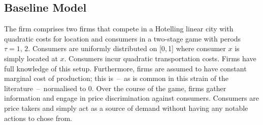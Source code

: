 \documentclass[a4paper, 11 pt, fleqn]{article}
\begin{document}
\subsection{Baseline Model} \label{sec:choe-baseline} %
The firm comprises two firms that compete in a Hotelling linear city with quadratic costs for location and consumers in a two-stage game
with perods $\tau = 1,\,2$. Consumers are uniformly distributed on [0,\,1] where consumer $x$ is simply located at $x$.
Consumers incur quadratic transportation costs. Firms have full knowledge of this setup. Furthermore, firms are assumed to have constant
marginal cost of production; this is~--~as is common in this strain of the literature~--~normalised to 0. Over the course of the game,
firms gather information and engage in price discrimination against consumers. Consumers are price takers and simply act as a source of
demand without having any notable actions to chose from.
%
\end{document}
